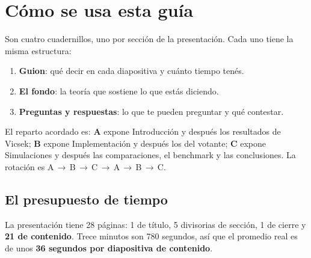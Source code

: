 \documentclass[11pt]{article}
\begin{document}

\tableofcontents
\clearpage

\section{Cómo se usa esta guía}

Son cuatro cuadernillos, uno por sección de la presentación. Cada uno tiene la
misma estructura:

\begin{enumerate}
  \item \textbf{Guion}: qué decir en cada diapositiva y cuánto tiempo tenés.
  \item \textbf{El fondo}: la teoría que sostiene lo que estás diciendo.
  \item \textbf{Preguntas y respuestas}: lo que te pueden preguntar y qué contestar.
\end{enumerate}

El reparto acordado es: \textbf{A} expone Introducción y después los resultados
de Vicsek; \textbf{B} expone Implementación y después los del votante;
\textbf{C} expone Simulaciones y después las comparaciones, el benchmark y las
conclusiones. La rotación es A\,$\to$\,B\,$\to$\,C\,$\to$\,A\,$\to$\,B\,$\to$\,C.


\subsection{El presupuesto de tiempo}

La presentación tiene 28 páginas: 1 de título, 5 divisorias de sección,
1 de cierre y \textbf{21 de contenido}. Trece minutos son 780 segundos, así que
el promedio real es de unos \textbf{36 segundos por diapositiva de contenido}.

\end{document}
